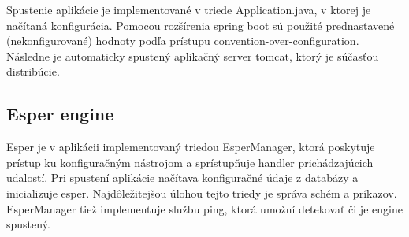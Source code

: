 		Spustenie aplikácie je implementované v triede Application.java, v ktorej je načítaná konfigurácia. Pomocou rozšírenia spring boot sú použité prednastavené (nekonfigurované) hodnoty podľa prístupu convention-over-configuration. Následne je automaticky spustený aplikačný server tomcat, ktorý je súčasťou distribúcie.

	\subsection{Esper engine}
		Esper je v aplikácii implementovaný triedou EsperManager, ktorá poskytuje prístup ku konfiguračným nástrojom a sprístupňuje handler prichádzajúcich udalostí. Pri spustení aplikácie načítava konfiguračné údaje z databázy a inicializuje esper. Najdôležitejšou úlohou tejto triedy je správa schém a príkazov. EsperManager tiež implementuje službu ping, ktorá umožní detekovať či je engine spustený.
		
